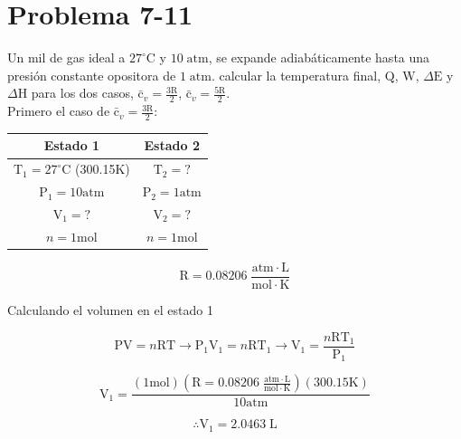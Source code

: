 \documentclass[12pt]{article}
\begin{document}
\section*{Problema 7-11}
Un mil de gas ideal a $27^{\circ}\mathrm{C}$ y $10 \; \mathrm{atm}$, se expande adiabáticamente hasta una presión constante opositora de $1\;\mathrm{atm}$. calcular la temperatura final, $\mathrm{Q}$, $\mathrm{W}$, $\Delta\mathrm{E}$ y $\Delta\mathrm{H}$ para los dos casos, $\mathrm{\bar{c}}_v=\frac{3\mathrm{R}}{2}$, $\mathrm{\bar{c}}_v=\frac{5\mathrm{R}}{2}$.\\

Primero el caso de $\mathrm{\bar{c}}_v=\frac{3\mathrm{R}}{2}$:
\begin{center}
	\begin{tabular}{| c | c |}
		\hline
		Estado 1 &     Estado 2 \\ \hline
		$\mathrm{T}_1=27^{\circ}\mathrm{C}$\; (300.15$\mathrm{K}$) &    $\mathrm{T}_2=?$ \\
		$\mathrm{P}_1=10\mathrm{atm}$ &    $\mathrm{P}_2=1\mathrm{atm}$ \\
		$\mathrm{V}_1=?$ &    $\mathrm{V}_2=?$\\
		$n=1\mathrm{mol}$&    $n=1\mathrm{mol}$\\ \hline
	\end{tabular}

\begin{displaymath}
	\mathrm{R}=0.08206\; \frac{\mathrm{atm}\cdot\mathrm{L}}{\mathrm{mol}\cdot\mathrm{K}}
\end{displaymath}
\end{center}

Calculando el volumen en el estado 1

\begin{displaymath}
	\mathrm{P}\mathrm{V}=n\mathrm{R}\mathrm{T} \rightarrow \mathrm{P}_1\mathrm{V}_1=n\mathrm{R}\mathrm{T}_1 \rightarrow \mathrm{V}_1=\frac{n\mathrm{R}\mathrm{T}_1}{\mathrm{P}_1}
\end{displaymath}

\begin{displaymath}
	\mathrm{V}_1=\frac{(1\mathrm{mol})(	\mathrm{R}=0.08206\; \frac{\mathrm{atm}\cdot\mathrm{L}}{\mathrm{mol}\cdot\mathrm{K}})(300.15\mathrm{K})}{10\mathrm{atm}}
\end{displaymath}

\begin{displaymath}
	\therefore\mathrm{V}_1=2.0463 \;\mathrm{L}
\end{displaymath}
\end{document}
